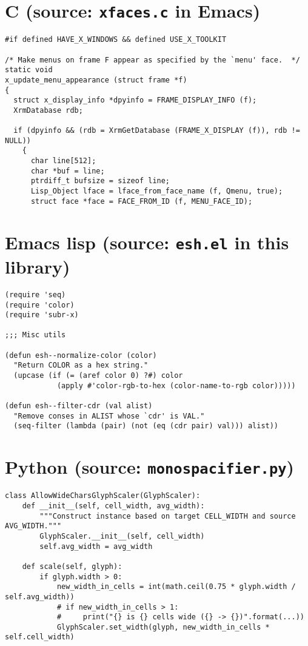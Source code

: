 \documentclass{article}
\begin{document}
\section*{C (source: \texttt{xfaces.c} in Emacs)}

\begin{verbatim}
#if defined HAVE_X_WINDOWS && defined USE_X_TOOLKIT

/* Make menus on frame F appear as specified by the `menu' face.  */
static void
x_update_menu_appearance (struct frame *f)
{
  struct x_display_info *dpyinfo = FRAME_DISPLAY_INFO (f);
  XrmDatabase rdb;

  if (dpyinfo && (rdb = XrmGetDatabase (FRAME_X_DISPLAY (f)), rdb != NULL))
    {
      char line[512];
      char *buf = line;
      ptrdiff_t bufsize = sizeof line;
      Lisp_Object lface = lface_from_face_name (f, Qmenu, true);
      struct face *face = FACE_FROM_ID (f, MENU_FACE_ID);
\end{verbatim}

\section*{Emacs lisp (source: \texttt{esh.el} in this library)}

\begin{verbatim}
(require 'seq)
(require 'color)
(require 'subr-x)

;;; Misc utils

(defun esh--normalize-color (color)
  "Return COLOR as a hex string."
  (upcase (if (= (aref color 0) ?#) color
            (apply #'color-rgb-to-hex (color-name-to-rgb color)))))

(defun esh--filter-cdr (val alist)
  "Remove conses in ALIST whose `cdr' is VAL."
  (seq-filter (lambda (pair) (not (eq (cdr pair) val))) alist))
\end{verbatim}

\section*{Python (source: \texttt{monospacifier.py})}

\begin{verbatim}
class AllowWideCharsGlyphScaler(GlyphScaler):
    def __init__(self, cell_width, avg_width):
        """Construct instance based on target CELL_WIDTH and source AVG_WIDTH."""
        GlyphScaler.__init__(self, cell_width)
        self.avg_width = avg_width

    def scale(self, glyph):
        if glyph.width > 0:
            new_width_in_cells = int(math.ceil(0.75 * glyph.width / self.avg_width))
            # if new_width_in_cells > 1:
            #     print("{} is {} cells wide ({} -> {})".format(...))
            GlyphScaler.set_width(glyph, new_width_in_cells * self.cell_width)
\end{verbatim}
\end{document}
